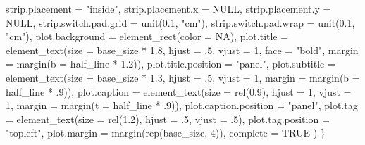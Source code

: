 \documentclass[
  letterpaper,
  DIV=11,
  numbers=noendperiod]{scrreprt}
\newenvironment{Shaded}{\begin{snugshade}}{\end{snugshade}}
\newcommand{\AttributeTok}[1]{\textcolor[rgb]{0.40,0.45,0.13}{#1}}
\newcommand{\ConstantTok}[1]{\textcolor[rgb]{0.56,0.35,0.01}{#1}}
\newcommand{\DecValTok}[1]{\textcolor[rgb]{0.68,0.00,0.00}{#1}}
\newcommand{\FloatTok}[1]{\textcolor[rgb]{0.68,0.00,0.00}{#1}}
\newcommand{\FunctionTok}[1]{\textcolor[rgb]{0.28,0.35,0.67}{#1}}
\newcommand{\NormalTok}[1]{\textcolor[rgb]{0.00,0.23,0.31}{#1}}
\newcommand{\SpecialCharTok}[1]{\textcolor[rgb]{0.37,0.37,0.37}{#1}}
\newcommand{\StringTok}[1]{\textcolor[rgb]{0.13,0.47,0.30}{#1}}
\begin{document}
\begin{Shaded}
\begin{Highlighting}[]
    \AttributeTok{strip.placement =} \StringTok{"inside"}\NormalTok{,}
    \AttributeTok{strip.placement.x =} \ConstantTok{NULL}\NormalTok{,}
    \AttributeTok{strip.placement.y =} \ConstantTok{NULL}\NormalTok{,}
    \AttributeTok{strip.switch.pad.grid =} \FunctionTok{unit}\NormalTok{(}\FloatTok{0.1}\NormalTok{, }\StringTok{"cm"}\NormalTok{),}
    \AttributeTok{strip.switch.pad.wrap =} \FunctionTok{unit}\NormalTok{(}\FloatTok{0.1}\NormalTok{, }\StringTok{"cm"}\NormalTok{),}
    \AttributeTok{plot.background =} \FunctionTok{element\_rect}\NormalTok{(}\AttributeTok{color =} \ConstantTok{NA}\NormalTok{),}
    \AttributeTok{plot.title =} \FunctionTok{element\_text}\NormalTok{(}\AttributeTok{size =}\NormalTok{ base\_size }\SpecialCharTok{*} \FloatTok{1.8}\NormalTok{, }\AttributeTok{hjust =}\NormalTok{ .}\DecValTok{5}\NormalTok{,}
                              \AttributeTok{vjust =} \DecValTok{1}\NormalTok{, }\AttributeTok{face =} \StringTok{"bold"}\NormalTok{,}
                              \AttributeTok{margin =} \FunctionTok{margin}\NormalTok{(}\AttributeTok{b =}\NormalTok{ half\_line }\SpecialCharTok{*} \FloatTok{1.2}\NormalTok{)),}
    \AttributeTok{plot.title.position =} \StringTok{"panel"}\NormalTok{,}
    \AttributeTok{plot.subtitle =} \FunctionTok{element\_text}\NormalTok{(}\AttributeTok{size =}\NormalTok{ base\_size }\SpecialCharTok{*} \FloatTok{1.3}\NormalTok{,}
                                 \AttributeTok{hjust =}\NormalTok{ .}\DecValTok{5}\NormalTok{, }\AttributeTok{vjust =} \DecValTok{1}\NormalTok{,}
                                 \AttributeTok{margin =} \FunctionTok{margin}\NormalTok{(}\AttributeTok{b =}\NormalTok{ half\_line }\SpecialCharTok{*}\NormalTok{ .}\DecValTok{9}\NormalTok{)),}
    \AttributeTok{plot.caption =} \FunctionTok{element\_text}\NormalTok{(}\AttributeTok{size =} \FunctionTok{rel}\NormalTok{(}\FloatTok{0.9}\NormalTok{), }\AttributeTok{hjust =} \DecValTok{1}\NormalTok{, }\AttributeTok{vjust =} \DecValTok{1}\NormalTok{,}
                                \AttributeTok{margin =} \FunctionTok{margin}\NormalTok{(}\AttributeTok{t =}\NormalTok{ half\_line }\SpecialCharTok{*}\NormalTok{ .}\DecValTok{9}\NormalTok{)),}
    \AttributeTok{plot.caption.position =} \StringTok{"panel"}\NormalTok{,}
    \AttributeTok{plot.tag =} \FunctionTok{element\_text}\NormalTok{(}\AttributeTok{size =} \FunctionTok{rel}\NormalTok{(}\FloatTok{1.2}\NormalTok{), }\AttributeTok{hjust =}\NormalTok{ .}\DecValTok{5}\NormalTok{, }\AttributeTok{vjust =}\NormalTok{ .}\DecValTok{5}\NormalTok{),}
    \AttributeTok{plot.tag.position =} \StringTok{"topleft"}\NormalTok{,}
    \AttributeTok{plot.margin =} \FunctionTok{margin}\NormalTok{(}\FunctionTok{rep}\NormalTok{(base\_size, }\DecValTok{4}\NormalTok{)),}
    \AttributeTok{complete =} \ConstantTok{TRUE}
\NormalTok{  )}
\NormalTok{\}}
\end{Highlighting}
\end{Shaded}
\end{document}
